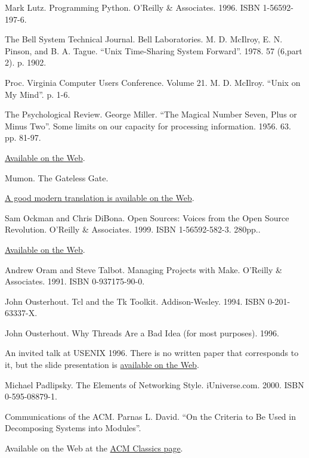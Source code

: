 \documentclass[12pt,oneside]{book}
\begin{document}
\begin{thebibliography}{9}
 Mark Lutz. Programming Python. O'Reilly \&{} Associates. 1996. ISBN 1-56592-197-6.

 The Bell System Technical Journal. Bell Laboratories. M. D. McIlroy, E. N. Pinson, and B. A. Tague. “Unix Time-Sharing System Forward”. 1978. 57 (6,part 2). p. 1902.

 Proc. Virginia Computer Users Conference. Volume 21. M. D. McIlroy. “Unix on My Mind”. p. 1-6.

 The Psychological Review. George Miller. “The Magical Number Seven, Plus or Minus Two”. Some limits on our capacity for processing information. 1956. 63. pp. 81-97.

\href{http://www.well.com/user/smalin/miller.html}{Available on the Web}.

 Mumon. The Gateless Gate.

\href{http://www.ibiblio.org/zen/cgi-bin/koan-index.pl}{A good modern translation is available on the Web}.

 Sam Ockman and Chris DiBona. Open Sources: Voices from the Open Source Revolution. O'Reilly \&{} Associates. 1999. ISBN 1-56592-582-3. 280pp..

\href{http://www.oreilly.com/catalog/opensources/book/toc.html}{Available on the Web}.

 Andrew Oram and Steve Talbot. Managing Projects with Make. O'Reilly \&{} Associates. 1991. ISBN 0-937175-90-0.

 John Ousterhout. Tcl and the Tk Toolkit. Addison-Wesley. 1994. ISBN 0-201-63337-X.

 John Ousterhout. Why Threads Are a Bad Idea (for most purposes). 1996.

An invited talk at USENIX 1996. There is no written paper that corresponds to it, but the slide presentation is \href{http://home.pacbell.net/ouster/threads.pdf}{available on the Web}.

 Michael Padlipsky. The Elements of Networking Style. iUniverse.com. 2000. ISBN 0-595-08879-1.

 Communications of the ACM. Parnas L. David. “On the Criteria to Be Used in Decomposing Systems into Modules”.

Available on the Web at the \href{http://www.acm.org/classics/may96/}{ACM Classics page}.


\end{thebibliography}
\end{document}
